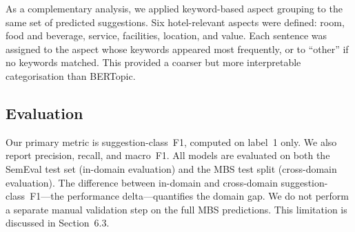 As a complementary analysis, we applied keyword-based aspect
grouping to the same set of predicted suggestions. Six
hotel-relevant aspects were defined: room, food and beverage,
service, facilities, location, and value. Each sentence was
assigned to the aspect whose keywords appeared most frequently,
or to ``other'' if no keywords matched. This provided a coarser
but more interpretable categorisation than BERTopic.

\subsection{Evaluation}

Our primary metric is suggestion-class~F1, computed on label~1 only. We also
report precision, recall, and macro~F1. All models are evaluated on both the
SemEval test set (in-domain evaluation) and the MBS test split (cross-domain
evaluation). The difference between in-domain and cross-domain
suggestion-class~F1---the performance delta---quantifies the domain gap.
We do not perform a separate manual validation step on the full
MBS predictions. This limitation is discussed in
Section~6.3.
